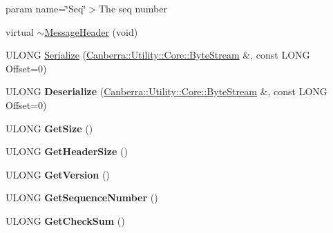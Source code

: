 \begin{DoxyCompactItemize}
\begin{DoxyCompactList}
param name=\char`\"{}\+Seq\char`\"{}$>$The seq number\end{DoxyCompactList}\item 
virtual \hyperlink{class_canberra_1_1_data_types_1_1_serialization_1_1_message_header_aa2a70c41a1faa824a497842935c4e8dc_aa2a70c41a1faa824a497842935c4e8dc}{$\sim$\+Message\+Header} (void)
\item 
U\+L\+O\+NG \hyperlink{class_canberra_1_1_data_types_1_1_serialization_1_1_message_header_a862c47b37152bb3cce530584e3a9feb4_a862c47b37152bb3cce530584e3a9feb4}{Serialize} (\hyperlink{class_canberra_1_1_utility_1_1_core_1_1_byte_stream}{Canberra\+::\+Utility\+::\+Core\+::\+Byte\+Stream} \&, const L\+O\+NG Offset=0)
\item 
\mbox{\label{class_canberra_1_1_data_types_1_1_serialization_1_1_message_header_a783e14faad035c9073b7b9645889c7bc}} 
U\+L\+O\+NG {\bfseries Deserialize} (\hyperlink{class_canberra_1_1_utility_1_1_core_1_1_byte_stream}{Canberra\+::\+Utility\+::\+Core\+::\+Byte\+Stream} \&, const L\+O\+NG Offset=0)
\item 
\mbox{\label{class_canberra_1_1_data_types_1_1_serialization_1_1_message_header_a05fa30ee4001caa14c7afa1f80e84aff}} 
U\+L\+O\+NG {\bfseries Get\+Size} ()
\item 
\mbox{\label{class_canberra_1_1_data_types_1_1_serialization_1_1_message_header_a1a084bb351d79f3d4c8dc18bcddd3420}} 
U\+L\+O\+NG {\bfseries Get\+Header\+Size} ()
\item 
\mbox{\label{class_canberra_1_1_data_types_1_1_serialization_1_1_message_header_ad954c3c5a4bec6646067c030e8a9085e}} 
U\+L\+O\+NG {\bfseries Get\+Version} ()
\item 
\mbox{\label{class_canberra_1_1_data_types_1_1_serialization_1_1_message_header_ae924e2c2db89181533f8b26869c7e038}} 
U\+L\+O\+NG {\bfseries Get\+Sequence\+Number} ()
\item 
\mbox{\label{class_canberra_1_1_data_types_1_1_serialization_1_1_message_header_acf97f1911dad8810c631f3682c3ec9c0}} 
U\+L\+O\+NG {\bfseries Get\+Check\+Sum} ()
\end{DoxyCompactItemize}
